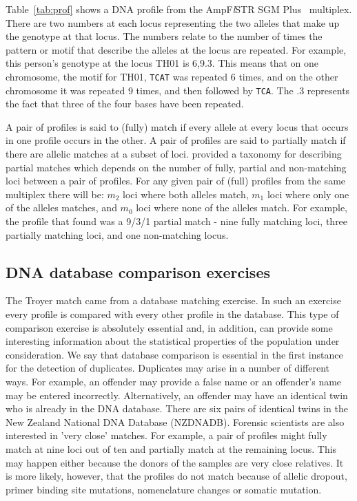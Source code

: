 \documentclass[a4paper,11pt]{article}
\newcommand{\SGMplus}{AmpF\textit{l}STR\textsuperscript{\textregistered}
  SGM Plus\textsuperscript{\texttrademark}}
\begin{document}
Table~\ref{tab:prof} shows a DNA profile from the \SGMplus~ multiplex.
There are two numbers at each locus representing the two alleles that
make up the genotype at that locus. The numbers relate to the number
of times the pattern or motif that describe the alleles at the locus
are repeated. For example, this person's genotype at the locus TH01 is
6,9.3. This means that on one chromosome, the motif for TH01,
\texttt{TCAT} was repeated 6 times, and on the other chromosome it was
repeated 9 times, and then followed by \texttt{TCA}. The .3 represents
the fact that three of the four bases have been repeated.

A pair of profiles is said to (fully) match if every allele at every
locus that occurs in one profile occurs in the other. A pair of
profiles are said to partially match if there are allelic matches at a
subset of loci.  \cite{weir2004} provided a taxonomy for describing
partial matches which depends on the number of fully, partial and
non-matching loci between a pair of profiles. For any given pair of
(full) profiles from the same multiplex there will be: $m_2$ loci
where both alleles match, $m_1$ loci where only one of the alleles
matches, and $m_0$ loci where none of the alleles match. For example,
the profile that \cite{troyer2001} found was a 9/3/1 partial match -
nine fully matching loci, three partially matching loci, and one
non-matching locus.

\subsection[Database comparisons]{DNA database comparison exercises}
\label{sec:dna-comp-exerc}
The Troyer match came from a database matching exercise. In such an
exercise every profile is compared with every other profile in the
database. This type of comparison exercise is absolutely essential
and, in addition, can provide some interesting information about the
statistical properties of the population under consideration. We say
that database comparison is essential in the first instance for the
detection of duplicates. Duplicates may arise in a number of different
ways. For example, an offender may provide a false name or an
offender's name may be entered incorrectly. Alternatively, an offender
may have an identical twin who is already in the DNA database. There
are six pairs of identical twins in the New Zealand National DNA
Database (NZDNADB). Forensic
scientists are also interested in 'very close' matches. 
For example, a pair of profiles
might fully match at nine loci out of ten and partially match at the
remaining locus. This may happen either because the donors of the
samples are very close relatives. It is  more likely, however, that
the profiles do not match because of allelic dropout,
primer binding site mutations, nomenclature changes or somatic mutation.
\end{document}
